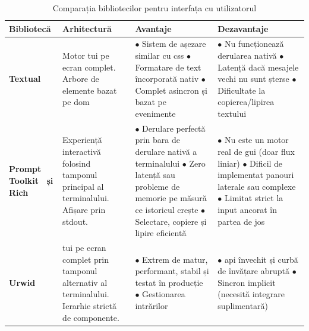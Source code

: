 \documentclass[12pt, a4paper, oneside, romanian]{teza-upb}
\begin{document}
  \begin{table}[H]
  \centering
  \small
  \setlength{\tabcolsep}{5pt}
  \renewcommand{\arraystretch}{1.6}
  \vspace{2mm}
    \begin{tabularx}{\textwidth}{@{} >{\hsize=0.55\hsize\RaggedRight}X >{\hsize=1.15\hsize\RaggedRight}X >{\hsize=1.15\hsize\RaggedRight}X >{\hsize=1.15\hsize\RaggedRight}X @{}}
      \toprule
      \textbf{Bibliotecă} & \textbf{Arhitectură} & \textbf{Avantaje} & \textbf{Dezavantaje} \\
      \midrule
      \textbf{Textual~\cite{api_textual}} &
      Motor \ac{tui} pe ecran complet. Arbore de elemente bazat pe \ac{dom} &
      $\bullet$ Sistem de așezare similar cu \ac{css} \newline
      $\bullet$ Formatare de text încorporată nativ \newline
      $\bullet$ Complet asincron și bazat pe evenimente &
      $\bullet$ Nu funcționează derularea nativă\newline
      $\bullet$ Latență dacă mesajele vechi nu sunt șterse\newline
      $\bullet$ Dificultate la copierea/lipirea textului \\
      \midrule
      \textbf{Prompt Toolkit~\cite{api_prompt_toolkit} și Rich~\cite{api_rich}} &
      Experiență interactivă folosind tamponul principal al terminalului. Afișare prin \ac{stdout}. &
      $\bullet$ Derulare perfectă prin bara de derulare nativă a terminalului\newline
      $\bullet$ Zero latență sau probleme de memorie pe măsură ce istoricul crește\newline
      $\bullet$ Selectare, copiere și lipire eficientă &
      $\bullet$ Nu este un motor real de \ac{gui} (doar flux liniar)\newline
      $\bullet$ Dificil de implementat panouri laterale sau complexe\newline
      $\bullet$ Limitat strict la input ancorat în partea de jos \\
      \midrule
      \textbf{Urwid~\cite{api_urwid}} &
      \ac{tui} pe ecran complet prin tamponul alternativ al terminalului. Ierarhie strictă de componente. &
      $\bullet$ Extrem de matur, performant, stabil și testat în producție\newline
      $\bullet$ Gestionarea intrărilor &
      $\bullet$ \ac{api} învechit și curbă de învățare abruptă\newline
      $\bullet$ Sincron implicit (necesită integrare suplimentară) \\
      \bottomrule
    \end{tabularx}
    \caption{Comparația bibliotecilor pentru interfața cu utilizatorul}
    \label{tab:ui_biblioteci}
  \end{table} 
\end{document}
